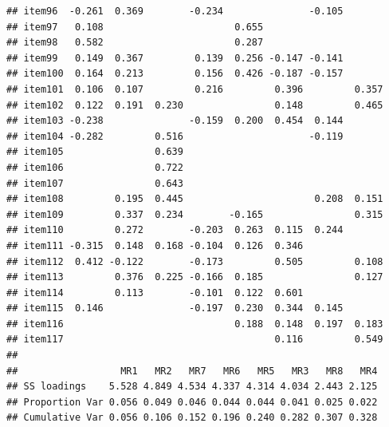 \documentclass[
  english,
  man]{apa6}
\begin{document}
\begin{verbatim}
## item96  -0.261  0.369        -0.234               -0.105       
## item97   0.108                       0.655                     
## item98   0.582                       0.287                     
## item99   0.149  0.367         0.139  0.256 -0.147 -0.141       
## item100  0.164  0.213         0.156  0.426 -0.187 -0.157       
## item101  0.106  0.107         0.216         0.396         0.357
## item102  0.122  0.191  0.230                0.148         0.465
## item103 -0.238               -0.159  0.200  0.454  0.144       
## item104 -0.282         0.516                      -0.119       
## item105                0.639                                   
## item106                0.722                                   
## item107                0.643                                   
## item108         0.195  0.445                       0.208  0.151
## item109         0.337  0.234        -0.165                0.315
## item110         0.272        -0.203  0.263  0.115  0.244       
## item111 -0.315  0.148  0.168 -0.104  0.126  0.346              
## item112  0.412 -0.122        -0.173         0.505         0.108
## item113         0.376  0.225 -0.166  0.185                0.127
## item114         0.113        -0.101  0.122  0.601              
## item115  0.146               -0.197  0.230  0.344  0.145       
## item116                              0.188  0.148  0.197  0.183
## item117                                     0.116         0.549
## 
##                  MR1   MR2   MR7   MR6   MR5   MR3   MR8   MR4
## SS loadings    5.528 4.849 4.534 4.337 4.314 4.034 2.443 2.125
## Proportion Var 0.056 0.049 0.046 0.044 0.044 0.041 0.025 0.022
## Cumulative Var 0.056 0.106 0.152 0.196 0.240 0.282 0.307 0.328
\end{verbatim}
\end{document}
